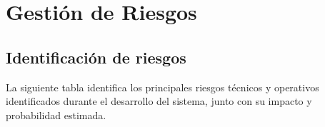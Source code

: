 \documentclass[12pt,letterpaper]{article}
\begin{document}










\section{Gestión de Riesgos}

\subsection{Identificación de riesgos}

La siguiente tabla identifica los principales riesgos técnicos y operativos identificados durante el desarrollo del sistema, junto con su impacto y probabilidad estimada.
\end{document}
